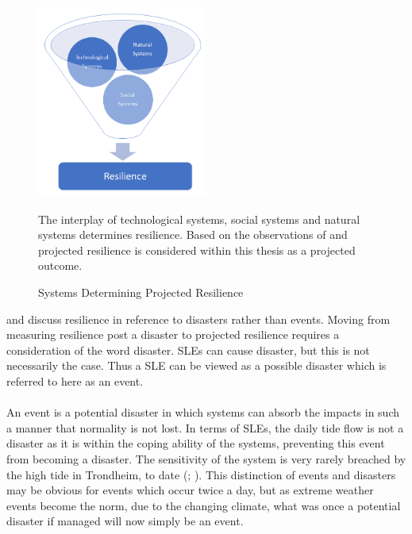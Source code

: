 \begin{figure}[!ht]
    \centering
    \includegraphics[width=0.5\textwidth]{fig_theory/resilience model .png}
    \caption{Systems Determining Projected Resilience}{The interplay of technological systems, social systems and natural systems determines resilience. Based on the observations of \cite{cutter_community_2020} and \cite{moser_turbulent_2019} projected resilience is considered within this thesis as a projected outcome.}
    \label{fig:projected_resilience}
\end{figure}

\cite{cutter_place-based_2008} and \cite{cutter_community_2020} discuss resilience in reference to disasters rather than events. Moving from measuring resilience post a disaster to projected resilience requires a consideration of the word disaster. SLEs can cause disaster, but this is not necessarily the case. Thus a SLE can be viewed as a possible disaster which is referred to here as an event. 
\paragraph{}
An event is a potential disaster in which systems can absorb the impacts in such a manner that normality is not lost. In terms of SLEs, the daily tide flow is not a disaster as it is within the coping ability of the systems, preventing this event from becoming a disaster. The sensitivity of the system is very rarely breached by the high tide in Trondheim, to date (\cite{tides_high_2022}; \cite{dsb_integrating-sea-level-rise-and-storm-surges--local-planningpdf_2017}). This distinction of events and disasters may be obvious for events which occur twice a day, but as extreme weather events become the norm, due to the changing climate, what was once a potential disaster if managed will now simply be an event. 
